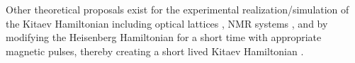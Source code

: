 \documentclass[aps,pra,preprint,groupedaddress]{revtex4-1}
\newcommand{\1}{\mathds{1}}
\begin{document}








Other theoretical proposals exist for the experimental realization/simulation of the Kitaev Hamiltonian including optical lattices \cite{Gorshkov}, NMR systems \cite{Du}, and by modifying the Heisenberg Hamiltonian for a short time with appropriate magnetic pulses, thereby creating a short lived Kitaev Hamiltonian \cite{Tanamoto}. 





\end{document}
